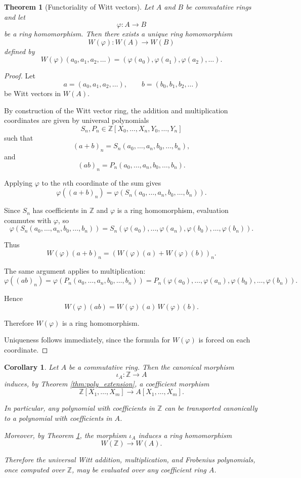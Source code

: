 \documentclass[oneside, a4paper, onecolumn, 11pt]{article}
\newtheorem{theorem}{Theorem}
\newtheorem{corollary}{Corollary}
\theoremstyle{definition}
\begin{document}
\begin{theorem}[Functoriality of Witt vectors]
\label{thm:Witt_functoriality}
Let $A$ and $B$ be commutative rings and let \[\varphi:A\to B \]
be a ring homomorphism. Then there exists a unique ring homomorphism \[W(\varphi):W(A)\to W(B) \]
defined by \[W(\varphi)(a_0,a_1,a_2,\dots) =(\varphi(a_0),\varphi(a_1),\varphi(a_2),\dots). \]
\end{theorem}

\begin{proof}
Let \[a=(a_0,a_1,a_2,\dots),\qquad b=(b_0,b_1,b_2,\dots) \]
be Witt vectors in $W(A)$.

By construction of the Witt vector ring, the addition and multiplication
coordinates are given by universal polynomials \[S_n,P_n\in\mathbb{Z}[X_0,\dots,X_n,Y_0,\dots,Y_n] \]
such that \[(a+b)_n=S_n(a_0,\dots,a_n,b_0,\dots,b_n), \]
and \[(ab)_n=P_n(a_0,\dots,a_n,b_0,\dots,b_n).\]

Applying $\varphi$ to the $n$th coordinate of the sum gives \[\varphi((a+b)_n)=\varphi(S_n(a_0,\dots,a_n,b_0,\dots,b_n)).\]

Since $S_n$ has coefficients in $\mathbb{Z}$ and $\varphi$ is a ring
homomorphism, evaluation commutes with $\varphi$, so \[\varphi(S_n(a_0,\dots,a_n,b_0,\dots,b_n))=S_n(\varphi(a_0),\dots,\varphi(a_n),\varphi(b_0),\dots,\varphi(b_n)).\]

Thus \[W(\varphi)(a+b)_n=(W(\varphi)(a)+W(\varphi)(b))_n.\]

The same argument applies to multiplication:
\[\varphi((ab)_n)=\varphi(P_n(a_0,\dots,a_n,b_0,\dots,b_n))=P_n(\varphi(a_0),\dots,\varphi(a_n),\varphi(b_0),\dots,\varphi(b_n)). \]

Hence \[W(\varphi)(ab)=W(\varphi)(a)\,W(\varphi)(b).\]

Therefore $W(\varphi)$ is a ring homomorphism.

Uniqueness follows immediately, since the formula for $W(\varphi)$ is forced
on each coordinate.
\end{proof}

\begin{corollary}\label{cor:ZZ_pipeline}
Let $A$ be a commutative ring. Then the canonical morphism \[\iota_A:\mathbb{Z}\to A\]
induces, by Theorem \ref{thm:poly_extension}, a coefficient morphism \[\mathbb{Z}[X_1,\dots,X_m]\to A[X_1,\dots,X_m].\]

In particular, any polynomial with coefficients in $\mathbb{Z}$ can be
transported canonically to a polynomial with coefficients in $A$.

Moreover, by Theorem \ref{thm:Witt_functoriality}, the morphism $\iota_A$
induces a ring homomorphism \[W(\mathbb{Z})\to W(A). \]

Therefore the universal Witt addition, multiplication, and Frobenius
polynomials, once computed over $\mathbb{Z}$, may be evaluated over any
coefficient ring $A$.
\end{corollary}
\end{document}
